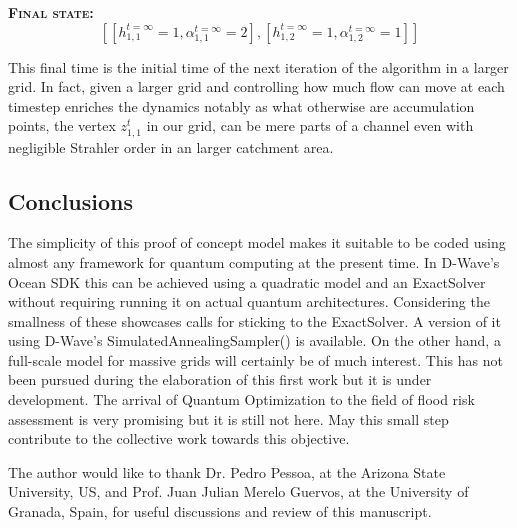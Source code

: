 \documentclass[%
 reprint,
 amsmath,amssymb,
 aps,
]{revtex4-2}
\begin{document}
\textsc{\textbf{Final state:}}
\begin{equation}
    \left[\left[h_{1,1}^{t=\infty}= 1, \alpha_{1,1}^{t=\infty} = 2\right], \left[h_{1,2}^{t=\infty}= 1, \alpha_{1,2}^{t=\infty} = 1\right]\right]
\end{equation}

This final time is the initial time of the next iteration of the algorithm in a larger grid. In fact, given a larger grid and controlling how much flow can move at each timestep enriches the dynamics notably as what otherwise are accumulation points, the vertex $z_{1,1}^t$ in our grid, can be mere parts of a channel even with negligible Strahler order in an larger catchment area. 

\subsection{\label{sec:citeref}Conclusions}

The simplicity of this proof of concept model makes it suitable to be coded using almost any framework for quantum computing at the present time. In D-Wave's Ocean SDK\cite{dwave_ocean_sdk} this can be achieved using a quadratic model and an ExactSolver without requiring running it on actual quantum architectures. Considering the smallness of these showcases calls for sticking to the ExactSolver. A version of it using D-Wave's SimulatedAnnealingSampler() is available\cite{qubodet8}. On the other hand, a full-scale model for massive grids will certainly be of much interest. This has not been pursued during the elaboration of this first work but it is under development. The arrival of Quantum Optimization to the field of flood risk assessment is very promising but it is still not here. May this small step contribute to the collective work towards this objective.
\\
\begin{acknowledgments}
The author would like to thank Dr. Pedro Pessoa, at the Arizona State University, US, and Prof. Juan Julian Merelo Guervos, at the University of Granada, Spain, for useful discussions and review of this manuscript.
\end{acknowledgments}

\nocite{*}

\end{document}
